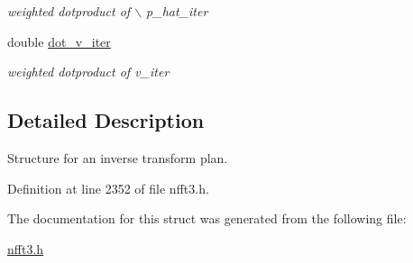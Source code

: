 \begin{CompactItemize}
\begin{CompactList}\small\item\em weighted dotproduct of $\backslash$ p\_\-hat\_\-iter \item\end{CompactList}\item 
\hypertarget{structinfsft__plan_o17}{
double \hyperlink{structinfsft__plan_o17}{dot\_\-v\_\-iter}}
\label{structinfsft__plan_o17}

\begin{CompactList}\small\item\em weighted dotproduct of v\_\-iter \item\end{CompactList}\end{CompactItemize}


\subsection{Detailed Description}
Structure for an inverse transform plan. 



Definition at line 2352 of file nfft3.h.

The documentation for this struct was generated from the following file:\begin{CompactItemize}
\item 
\hyperlink{nfft3_8h}{nfft3.h}\end{CompactItemize}
